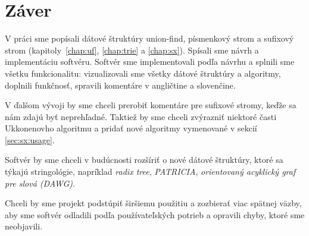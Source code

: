 \cleardoublepage
{}
{}
\chapter*{Záver}\label{chap:zaver}

V práci sme popísali dátové štruktúry union-find, písmenkový strom a sufixový 
strom (kapitoly~\ref{chap:uf}, \ref{chap:trie} a \ref{chap:sx}). Spísali sme 
návrh a implementáciu softvéru. Softvér sme implementovali 
podľa návrhu a splnili sme všetku funkcionalitu: vizualizovali sme všetky 
dátové štruktúry a algoritmy, doplnili funkčnosť, spravili komentáre v 
angličtine a slovenčine.

V ďalšom vývoji by sme chceli prerobiť komentáre pre sufixové stromy, keďže sa 
nám zdajú byť neprehľadné. Taktiež by sme chceli zvýrazniť niektoré časti 
Ukkonenovho algoritmu a pridať nové algoritmy vymenované v sekcií 
\ref{sec:sx:usage}.

Softvér by sme chceli v budúcnosti rozšíriť o nové dátové štruktúry, ktoré sa 
týkajú stringológie, napríklad \emph{radix tree}, \emph{PATRICIA}, 
\emph{orientovaný acyklický graf pre slová (DAWG)}.

Chceli by sme projekt podstúpiť širšiemu použitiu a zozbierať viac spätnej 
väzby, aby sme softvér odladili podľa používateľských potrieb a opravili 
chyby, ktoré sme neobjavili. 


\cleardoublepage
{}
{}

\printbibliography

\backmatter

